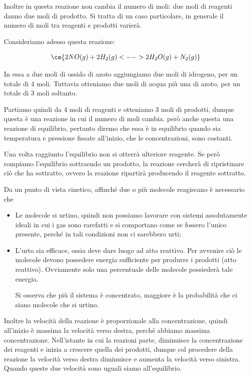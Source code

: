 Inoltre in questa reazione non cambia il numero di moli: due moli di reagenti danno due moli di prodotto. Si tratta di un caso particolare, in generale il numero di moli tra reagenti e prodotti varierà.

\vspace{0.2cm}Consideriamo adesso questa reazione:

$$\ce{2NO(g) + 2H_2(g) <--> 2H_2O(g) + N_2(g)}$$

In essa a due moli di ossido di azoto aggiungiamo due moli di idrogeno, per un totale di 4 moli. Tuttavia otteniamo due moli di acqua più una di azoto, per un totale di 3 moli soltanto.

Partiamo quindi da 4 moli di reagenti e otteniamo 3 moli di prodotti, dunque questa è una reazione in cui il numero di moli cambia. \E però anche questa una reazione di equilibrio, pertanto diremo che essa è in equilibrio quando sia temperatura e pressione fissate all'inizio, che le concentrazioni, sono costanti.

Una volta raggiunto l'equilibrio non si otterrà ulteriore reagente. Se però rompiamo l'equilibrio sottraendo un prodotto, la reazione cercherà di ripristinare ciò che ha sottratto, ovvero la reazione ripartirà producendo il reagente sottratto.

\vspace{0.2cm}Da un punto di vista cinetico, affinché due o più molecole reagiscano è necessario che

\begin{itemize}
    \item Le molecole si urtino, quindi non possiamo lavorare con sistemi assolutamente ideali in cui i gas sono rarefatti e si comportano come se fossero l'unico presente, perché in tali condizioni non ci sarebbero urti;
    \item L'urto sia efficace, ossia deve dare luogo ad atto reattivo. Per avvenire ciò le molecole devono possedere energia sufficiente per produrre i prodotti (atto reattivo). Ovviamente solo una percentuale delle molecole possiederà tale energia.

    Si osserva che più il sistema è concentrato, maggiore è la probabilità che ci siano molecole che si urtino.
\end{itemize}

Inoltre la velocità della reazione è proporzionale alla concentrazione, quindi all'inizio è massima la velocità verso destra, perché abbiamo massima concentrazione. Nell'istante in cui la reazioni parte, diminuisce la concentrazione dei reagenti e inizia a crescere quella dei prodotti, dunque col procedere della reazione la velocità verso destra diminuisce e aumenta la velocità verso sinistra. Quando queste due velocità sono uguali siamo all'equilibrio.
